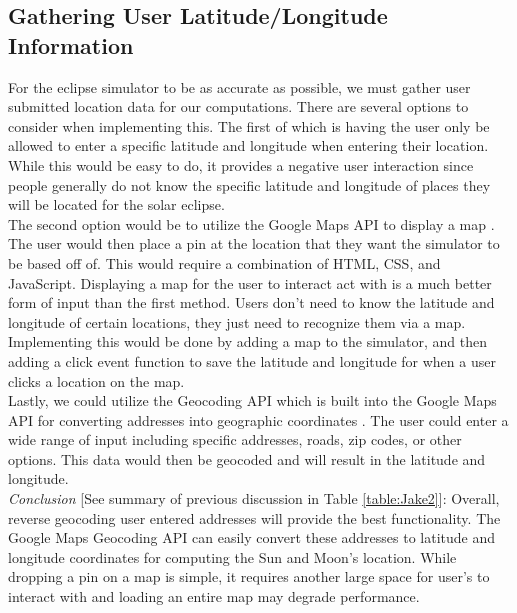 \documentclass[10pt, onecolumn, draftclsnofoot, letterpaper, compsoc]{IEEEtran}
\begin{document}
\subsection{Gathering User Latitude/Longitude Information}

For the eclipse simulator to be as accurate as possible, we must gather user
submitted location data for our computations. There are several options to
consider when implementing this. The first of which is having the user only be
allowed to enter a specific latitude and longitude when entering their
location. While this would be easy to do, it provides a negative user
interaction since people generally do not know the specific latitude and
longitude of places they will be located for the solar eclipse. \\

The second option would be to utilize the Google Maps API to display a map
\cite{jsAPI}.
The user would then place a pin at the location that they want the simulator
to be based off of. This would require a combination of HTML, CSS, and
JavaScript. Displaying a map for the user to interact act with is a much
better form of input than the first method. Users don't need to know the
latitude and longitude of certain locations, they just need to recognize
them via a map. Implementing this would be done by adding a map to the
simulator, and then adding a click event function to save the latitude and
longitude for when a user clicks a location on the map. \\

Lastly, we could utilize the Geocoding API which is built into the Google Maps
API for converting addresses into geographic coordinates \cite{jsGEO}.
The user could enter a wide range of input including specific addresses,
roads, zip codes, or other options. This data would then be geocoded and will
result in the latitude and longitude. \\

\textit{Conclusion} [See summary of previous discussion in Table \ref{table:Jake2}]:
Overall, reverse geocoding user entered addresses will provide the
best functionality. The Google Maps Geocoding API can easily convert these
addresses to latitude and longitude coordinates for computing the Sun and
Moon's location. While dropping a pin on a map is simple, it requires
another large space for user's to interact with and loading an entire
map may degrade performance. \\
\end{document}
